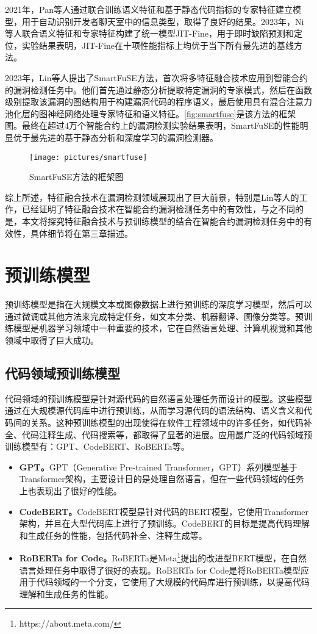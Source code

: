2021年，Pan等人\cite{pan2021}通过联合训练语义特征和基于静态代码指标的专家特征建立模型，用于自动识别开发者聊天室中的信息类型，取得了良好的结果。2023年，Ni等人\cite{bestofboth}联合语义特征和专家特征构建了统一模型JIT-Fine，用于即时缺陷预测和定位，实验结果表明，JIT-Fine在十项性能指标上均优于当下所有最先进的基线方法。

2023年，Lin等人\cite{bestofboth2024}提出了SmartFuSE方法，首次将多特征融合技术应用到智能合约的漏洞检测任务中。他们首先通过静态分析提取特定漏洞的专家模式，然后在函数级别提取该漏洞的图结构用于构建漏洞代码的程序语义，最后使用具有混合注意力池化层的图神经网络处理专家特征和语义特征。\autoref{fig:smartfuse}是该方法的框架图。最终在超过4万个智能合约上的漏洞检测实验结果表明，SmartFuSE的性能明显优于最先进的基于静态分析和深度学习的漏洞检测器。

\begin{figure}[htbp]
    \centering
    \texttt{[image: pictures/smartfuse]}
    \caption{\label{fig:smartfuse}SmartFuSE方法的框架图}
\end{figure}

综上所述，特征融合技术在漏洞检测领域展现出了巨大前景，特别是Lin等人\cite{bestofboth2024}的工作，已经证明了特征融合技术在智能合约漏洞检测任务中的有效性，与之不同的是，本文将探究特征融合技术与预训练模型的结合在智能合约漏洞检测任务中的有效性，具体细节将在第三章描述。
\section{预训练模型}
预训练模型是指在大规模文本或图像数据上进行预训练的深度学习模型，然后可以通过微调或其他方法来完成特定任务，如文本分类、机器翻译、图像分类等。预训练模型是机器学习领域中一种重要的技术，它在自然语言处理、计算机视觉和其他领域中取得了巨大成功。
\subsection{代码领域预训练模型}
代码领域的预训练模型是针对源代码的自然语言处理任务而设计的模型。这些模型通过在大规模源代码库中进行预训练，从而学习源代码的语法结构、语义含义和代码间的关系。这种预训练模型的出现使得在软件工程领域中的许多任务，如代码补全、代码注释生成、代码搜索等，都取得了显著的进展。应用最广泛的代码领域预训练模型有：GPT\cite{gpt}、CodeBERT\cite{codebert}、RoBERTa\cite{roberta}等。
\begin{itemize}
    \item \textbf{GPT。}GPT（Generative Pre-trained Transformer，GPT）系列模型基于Transformer架构，主要设计目的是处理自然语言，但在一些代码领域的任务上也表现出了很好的性能。
    \item \textbf{CodeBERT。}CodeBERT模型是针对代码的BERT模型\cite{bert}，它使用Transformer架构，并且在大型代码库上进行了预训练。CodeBERT的目标是提高代码理解和生成任务的性能，包括代码补全、注释生成等。
    \item \textbf{RoBERTa for Code。}RoBERTa是Meta\footnote{https://about.meta.com/}提出的改进型BERT模型，在自然语言处理任务中取得了很好的表现。RoBERTa for Code是将RoBERTa模型应用于代码领域的一个分支，它使用了大规模的代码库进行预训练，以提高代码理解和生成任务的性能。
\end{itemize}

